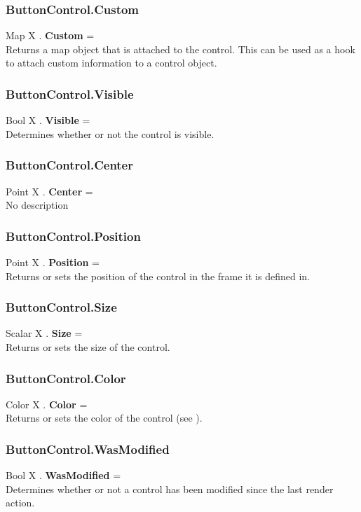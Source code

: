\subsubsection{ButtonControl.Custom \label{F:ButtonControl:Custom}}
Map X . \textbf{Custom} = \\
Returns a map object that is attached to the control. This can be used as a hook to attach custom information to a control object.

\subsubsection{ButtonControl.Visible \label{F:ButtonControl:Visible}}
Bool X . \textbf{Visible} = \\
Determines whether or not the control is visible.

\subsubsection{ButtonControl.Center \label{F:ButtonControl:Center}}
Point X . \textbf{Center} = \\
No description

\subsubsection{ButtonControl.Position \label{F:ButtonControl:Position}}
Point X . \textbf{Position} = \\
Returns or sets the position of the control in the frame it is defined in.

\subsubsection{ButtonControl.Size \label{F:ButtonControl:Size}}
Scalar X . \textbf{Size} = \\
Returns or sets the size of the control.

\subsubsection{ButtonControl.Color \label{F:ButtonControl:Color}}
Color X . \textbf{Color} = \\
Returns or sets the color of the control (see ).

\subsubsection{ButtonControl.WasModified \label{F:ButtonControl:WasModified}}
Bool X . \textbf{WasModified} = \\
Determines whether or not a control has been modified since the last render action.

